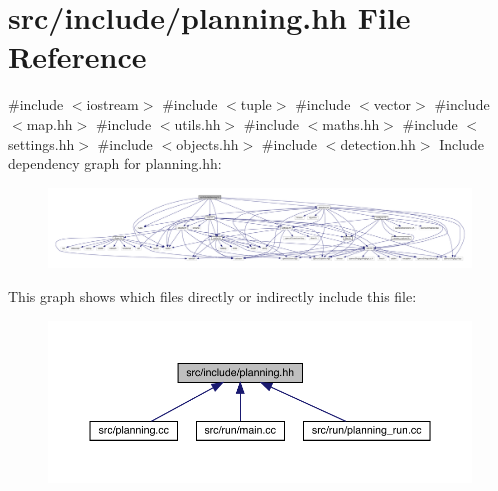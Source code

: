 \hypertarget{planning_8hh}{}\section{src/include/planning.hh File Reference}
\label{planning_8hh}
{\ttfamily \#include $<$iostream$>$}\newline
{\ttfamily \#include $<$tuple$>$}\newline
{\ttfamily \#include $<$vector$>$}\newline
{\ttfamily \#include $<$map.\+hh$>$}\newline
{\ttfamily \#include $<$utils.\+hh$>$}\newline
{\ttfamily \#include $<$maths.\+hh$>$}\newline
{\ttfamily \#include $<$settings.\+hh$>$}\newline
{\ttfamily \#include $<$objects.\+hh$>$}\newline
{\ttfamily \#include $<$detection.\+hh$>$}\newline
Include dependency graph for planning.\+hh\+:
\nopagebreak
\begin{figure}[H]
\begin{center}
\leavevmode
\includegraphics[width=350pt]{planning_8hh__incl}
\end{center}
\end{figure}
This graph shows which files directly or indirectly include this file\+:
\nopagebreak
\begin{figure}[H]
\begin{center}
\leavevmode
\includegraphics[width=350pt]{planning_8hh__dep__incl}
\end{center}
\end{figure}
